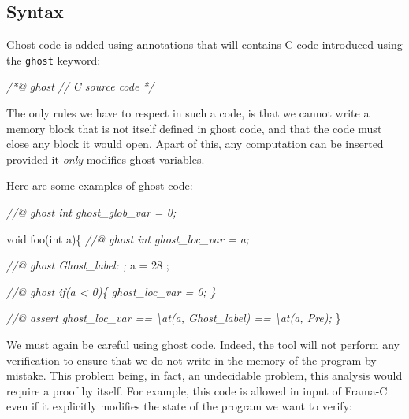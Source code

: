 \documentclass[12pt,francais,]{scrbook}
\newenvironment{Shaded}{}{}
\newcommand{\DataTypeTok}[1]{\textcolor[rgb]{0.56,0.13,0.00}{{#1}}}
\newcommand{\DecValTok}[1]{\textcolor[rgb]{0.25,0.63,0.44}{{#1}}}
\newcommand{\CommentTok}[1]{\textcolor[rgb]{0.38,0.63,0.69}{\textit{{#1}}}}
\newcommand{\NormalTok}[1]{{#1}}
\begin{document}
\subsection{Syntax}\label{syntax-4}

Ghost code is added using annotations that will contains C code
introduced using the \texttt{ghost} keyword:

\begin{footnotesize}\begin{Shaded}
\begin{Highlighting}[]
\CommentTok{/*@}
\CommentTok{  ghost}
\CommentTok{  // C source code}
\CommentTok{*/}
\end{Highlighting}
\end{Shaded}\end{footnotesize}

The only rules we have to respect in such a code, is that we cannot
write a memory block that is not itself defined in ghost code, and that
the code must close any block it would open. Apart of this, any
computation can be inserted provided it \emph{only} modifies ghost
variables.

Here are some examples of ghost code:

\begin{footnotesize}\begin{Shaded}
\begin{Highlighting}[]
\CommentTok{//@ ghost int ghost_glob_var = 0;}

\DataTypeTok{void} \NormalTok{foo(}\DataTypeTok{int} \NormalTok{a)\{}
  \CommentTok{//@ ghost int ghost_loc_var = a;}

  \CommentTok{//@ ghost Ghost_label: ;}
  \NormalTok{a = }\DecValTok{28} \NormalTok{;}

  \CommentTok{//@ ghost if(a < 0)\{ ghost_loc_var = 0; \}}

  \CommentTok{//@ assert ghost_loc_var == \textbackslash{}at(a, Ghost_label) == \textbackslash{}at(a, Pre);}
\NormalTok{\}}
\end{Highlighting}
\end{Shaded}\end{footnotesize}

We must again be careful using ghost code. Indeed, the tool will not
perform any verification to ensure that we do not write in the memory of
the program by mistake. This problem being, in fact, an undecidable
problem, this analysis would require a proof by itself. For example,
this code is allowed in input of Frama-C even if it explicitly modifies
the state of the program we want to verify:
\end{document}
